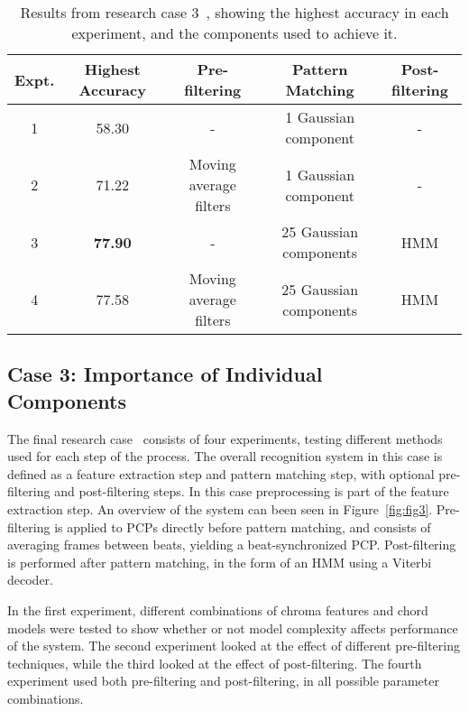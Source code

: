 \documentclass{sig-alternate}
\begin{document}
\begin{table*}
\centering
\begin{tabular}{|c|c|c|c|c|} \hline
\textbf{Expt.} & \textbf{Highest Accuracy} & \textbf{Pre-filtering} & \textbf{Pattern Matching} & \textbf{Post-filtering} \\ \hline
1 & 58.30 & - & 1 Gaussian component & - \\ \hline
2 & 71.22 & Moving average filters & 1 Gaussian component & - \\ \hline
3 & \textbf{77.90} & - & 25 Gaussian components & HMM \\ \hline
4 & 77.58 & Moving average filters & 25 Gaussian components & HMM \\ \hline

\end{tabular}
\caption{Results from research case 3~\cite{TaeMin:2014}, showing the highest accuracy in each experiment, and the components used to achieve it.}
\label{tab:tab9}
\end{table*}

\subsection{Case 3: Importance of Individual \\ Components}

The final research case~\cite{TaeMin:2014} consists of four experiments, testing different methods used for each step of the process. The overall recognition system in this case is defined as a feature extraction step and pattern matching step, with optional pre-filtering and post-filtering steps. In this case preprocessing is part of the feature extraction step. An overview of the system can been seen in Figure~\ref{fig:fig3}. Pre-filtering is applied to PCPs directly before pattern matching, and consists of averaging frames between beats, yielding a beat-synchronized PCP. Post-filtering is performed after pattern matching, in the form of an HMM using a Viterbi decoder.

In the first experiment, different combinations of chroma features and chord models were tested to show whether or not model complexity affects performance of the system. The second experiment looked at the effect of different pre-filtering techniques, while the third looked at the effect of post-filtering. The fourth experiment used both pre-filtering and post-filtering, in all possible parameter combinations.
\end{document}
